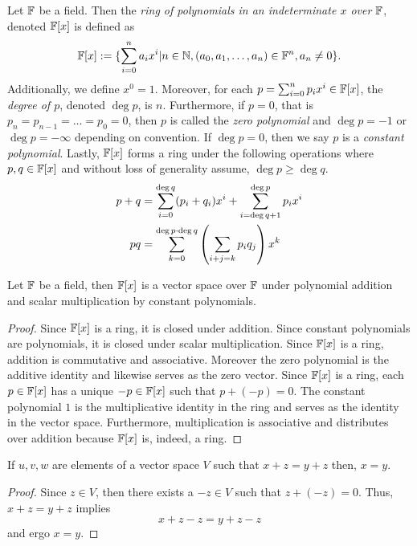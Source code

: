 \begin{definition}
	Let $\mathbb{F}$ be a field.
	Then the \textit{ring of polynomials in an indeterminate $x$ over $\mathbb{F}$}, denoted $\mathbb{F}[x]$ is defined as
	\[
		\mathbb{F}[x] := \lbrace \sum_{i=0}^n a_i x^i | n\in\mathbb{N}, (a_0,a_1,\ldots,a_n)\in\mathbb{F}^n, a_n\neq 0 \rbrace.
	\]
	Additionally, we define $x^0=1$.
	Moreover, for each $p=\sum_{i=0}^n p_ix^i\in\mathbb{F}[x]$, the \textit{degree of $p$}, denoted $\deg p$, is $n$.
	Furthermore, if $p=0$, that is $p_n=p_{n-1}=\ldots=p_0=0$, then $p$ is called the \textit{zero polynomial} and $\deg p = -1$ or $\deg p =-\infty$ depending on convention.
	If $\deg p=0$, then we say $p$ is a \textit{constant polynomial}.
	Lastly, $\mathbb{F}[x]$ forms a ring under the following operations where $p,q\in\mathbb{F}[x]$ and without loss of generality assume, $\deg p \geq\deg q$.
	\begin{align*}
		p+q &=\sum_{i=0}^{\deg q} (p_i+q_i)x^i +\sum_{i=\deg q + 1}^{\deg p} p_ix^i\\
		p q &= \sum_{k=0}^{\deg p \cdot \deg q} \left( \sum_{i+j=k} p_iq_j \right) x^k
	\end{align*}
\end{definition}
\begin{example}
	Let $\mathbb{F}$ be a field, then $\mathbb{F}[x]$ is a vector space over $\mathbb{F}$ under polynomial addition and scalar multiplication by constant polynomials.
\end{example}
\begin{proof}
	Since $\mathbb{F}[x]$ is a ring, it is closed under addition.
	Since constant polynomials are polynomials, it is closed under scalar multiplication.
	Since $\mathbb{F}[x]$ is a ring, addition is commutative and associative.
	Moreover the zero polynomial is the additive identity and likewise serves as the zero vector.
	Since $\mathbb{F}[x]$ is a ring, each $p\in\mathbb{F}[x]$ has a unique $-p\in\mathbb{F}[x]$ such that $p+(-p)=0$.
	The constant polynomial $1$ is the multiplicative identity in the ring and serves as the identity in the vector space.
	Furthermore, multiplication is associative and distributes over addition because $\mathbb{F}[x]$ is, indeed, a ring.
\end{proof}

\begin{proposition}
	If $u,v,w$ are elements of a vector space $V$ such that $x+z=y+z$ then, $x=y$.
\end{proposition}
\begin{proof}
	Since $z\in V$, then there exists a $-z\in V$ such that $z+(-z)=0$.
	Thus, $x+z=y+z$ implies
	\[
		x+z-z=y+z-z
	\]
	and ergo $x=y$.
\end{proof}

